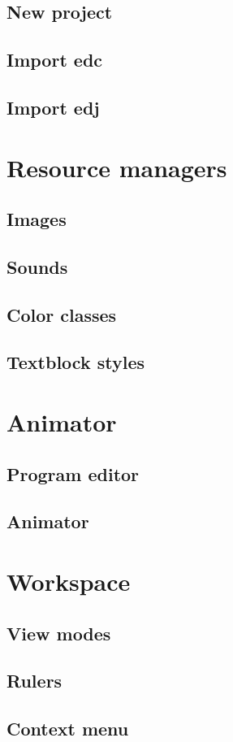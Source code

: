 \documentclass[titlepage,oneside,11pt]{book}
\begin{document}
\subsection{New project}
\subsection{Import edc}
\subsection{Import edj}
\section{Resource managers}
\subsection{Images}
\subsection{Sounds}
\subsection{Color classes}
\subsection{Textblock styles}
\section{Animator}
\subsection{Program editor}
\subsection{Animator}
\section{Workspace}
\subsection{View modes}
\subsection{Rulers}
\subsection{Context menu}
\end{document}
